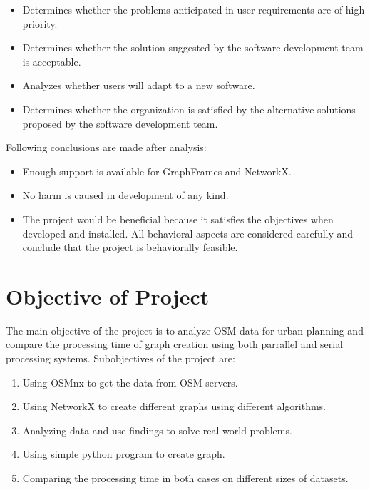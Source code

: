 \begin{itemize}
	\item Determines whether the problems anticipated in user requirements are of high priority.
	\item Determines whether the solution suggested by the software development team is acceptable.
	\item Analyzes whether users will adapt to a new software.
	\item Determines whether the organization is satisfied by the alternative solutions proposed by the software development team.
\end{itemize}

Following conclusions are made after analysis:
\begin{itemize}
	\item Enough support is available for GraphFrames and NetworkX.
	\item No harm is caused in development of any kind.
	\item The project would be beneficial because it satisfies the objectives when developed and installed. All behavioral aspects are considered carefully and conclude that the project is behaviorally feasible.
\end{itemize}

\section{Objective of Project}
 	The main objective of the project is to analyze OSM data for urban planning and compare the processing time of graph creation using both parrallel and serial processing systems. Subobjectives of the project are: 
\begin{enumerate}
\item Using OSMnx to get the data from OSM servers. 
\item Using NetworkX to create different graphs using different algorithms.
\item Analyzing data and use findings to solve real world problems.
\item Using simple python program to create graph.
\item Comparing the processing time in both cases on different sizes of datasets.
\end{enumerate}



